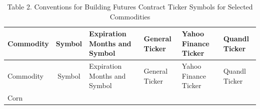 \documentclass[]{book}
\theoremstyle{definition}
\theoremstyle{definition}
\theoremstyle{remark}
\begin{document}
\begin{longtable}[]{@{}lcllll@{}}
\caption{Table 2. Conventions for Building Futures Contract Ticker
Symbols for Selected Commodities}\tabularnewline
\toprule
\begin{minipage}[b]{0.07\columnwidth}\raggedright\strut
Commodity\strut
\end{minipage} & \begin{minipage}[b]{0.07\columnwidth}\centering\strut
Symbol\strut
\end{minipage} & \begin{minipage}[b]{0.32\columnwidth}\raggedright\strut
Expiration Months and Symbol\strut
\end{minipage} & \begin{minipage}[b]{0.13\columnwidth}\raggedright\strut
General Ticker\strut
\end{minipage} & \begin{minipage}[b]{0.13\columnwidth}\raggedright\strut
Yahoo Finance Ticker\strut
\end{minipage} & \begin{minipage}[b]{0.13\columnwidth}\raggedright\strut
Quandl Ticker\strut
\end{minipage}\tabularnewline
\midrule
\endfirsthead
\toprule
\begin{minipage}[b]{0.07\columnwidth}\raggedright\strut
Commodity\strut
\end{minipage} & \begin{minipage}[b]{0.07\columnwidth}\centering\strut
Symbol\strut
\end{minipage} & \begin{minipage}[b]{0.32\columnwidth}\raggedright\strut
Expiration Months and Symbol\strut
\end{minipage} & \begin{minipage}[b]{0.13\columnwidth}\raggedright\strut
General Ticker\strut
\end{minipage} & \begin{minipage}[b]{0.13\columnwidth}\raggedright\strut
Yahoo Finance Ticker\strut
\end{minipage} & \begin{minipage}[b]{0.13\columnwidth}\raggedright\strut
Quandl Ticker\strut
\end{minipage}\tabularnewline
\midrule
\endhead
\begin{minipage}[t]{0.07\columnwidth}\raggedright\strut
Corn\strut
\end{minipage} & \begin{minipage}[t]{0.07\columnwidth}\centering\strut

\end{minipage}
\end{longtable}
\end{document}
